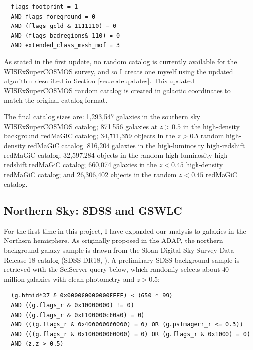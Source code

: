\documentclass[11pt, oneside]{article}   	%
\begin{document}
\small
\begin{verbatim}
  flags_footprint = 1 
  AND flags_foreground = 0 
  AND (flags_gold & 1111110) = 0 
  AND (flags_badregions& 110) = 0 
  AND extended_class_mash_mof = 3
\end{verbatim}
\normalsize

%
As stated in the first update, no random catalog is currently available for the WISExSuperCOSMOS survey, and so I create one myself using the updated algorithm described in Section \ref{sec:codeupdates}. This updated WISExSuperCOSMOS random catalog is created in galactic coordinates to match the original catalog format. 

The final catalog sizes are: 1,293,547 galaxies in the southern sky WISExSuperCOSMOS catalog; 871,556 galaxies at $z > 0.5$ in the high-density background redMaGiC catalog; 34,711,359 objects in the $z > 0.5$ random high-density redMaGiC catalog; 816,204 galaxies in the high-luminosity high-redshift  redMaGiC catalog; 32,597,284 objects in the random high-luminosity high-redshift redMaGiC catalog; 660,074 galaxies in the $z < 0.45$ high-density redMaGiC catalog; and 26,306,402 objects in the random $z < 0.45$ redMaGiC catalog. 

\subsection{Northern Sky: SDSS and GSWLC}

For the first time in this project, I have expanded our analysis to galaxies in the Northern hemisphere. As originally proposed in the ADAP, the northern background galaxy sample is drawn from the Sloan Digital Sky Survey Data Release 18 catalog (SDSS DR18, \cite{almeida2023eighteenth}). %
A preliminary SDSS background sample is retrieved with the SciServer query below, which randomly selects about 40 million galaxies with clean photometry and $z > 0.5$: 

\small
\begin{verbatim}
  (g.htmid*37 & 0x000000000000FFFF) < (650 * 99)
  AND ((g.flags_r & 0x10000000) != 0)  
  AND ((g.flags_r & 0x8100000c00a0) = 0)  
  AND (((g.flags_r & 0x400000000000) = 0) OR (g.psfmagerr_r <= 0.3))  
  AND (((g.flags_r & 0x100000000000) = 0) OR (g.flags_r & 0x1000) = 0)   
  AND (z.z > 0.5)
\end{verbatim}
\normalsize
\end{document}
